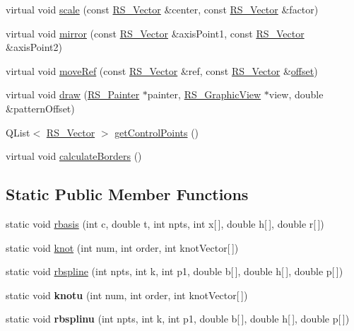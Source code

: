 \begin{DoxyCompactItemize}
\item 
virtual void \hyperlink{classRS__Spline_a0bcd286aa6e083eceba53390a56a9c6b}{scale} (const \hyperlink{classRS__Vector}{R\-S\-\_\-\-Vector} \&center, const \hyperlink{classRS__Vector}{R\-S\-\_\-\-Vector} \&factor)
\item 
virtual void \hyperlink{classRS__Spline_a21454167f4010bc0d2436aa8d8379313}{mirror} (const \hyperlink{classRS__Vector}{R\-S\-\_\-\-Vector} \&axis\-Point1, const \hyperlink{classRS__Vector}{R\-S\-\_\-\-Vector} \&axis\-Point2)
\item 
virtual void \hyperlink{classRS__Spline_ae57cfa1b12e958a176950db6931daee5}{move\-Ref} (const \hyperlink{classRS__Vector}{R\-S\-\_\-\-Vector} \&ref, const \hyperlink{classRS__Vector}{R\-S\-\_\-\-Vector} \&\hyperlink{classRS__Entity_aa296d21b9aac99161d386ce2f60f0fea}{offset})
\item 
virtual void \hyperlink{classRS__Spline_afe87f24a39ca03e2aaba0647846abf0c}{draw} (\hyperlink{classRS__Painter}{R\-S\-\_\-\-Painter} $\ast$painter, \hyperlink{classRS__GraphicView}{R\-S\-\_\-\-Graphic\-View} $\ast$view, double \&pattern\-Offset)
\item 
Q\-List$<$ \hyperlink{classRS__Vector}{R\-S\-\_\-\-Vector} $>$ \hyperlink{classRS__Spline_aef536f161e526820be8ba3bf5748a6d6}{get\-Control\-Points} ()
\item 
virtual void \hyperlink{classRS__Spline_a22585601e62ab8c0b90f945f90302f13}{calculate\-Borders} ()
\end{DoxyCompactItemize}
\subsection*{Static Public Member Functions}
\begin{DoxyCompactItemize}
\item 
static void \hyperlink{classRS__Spline_ac17c9d2c444e5c99bb2fe6886a3910d5}{rbasis} (int c, double t, int npts, int x\mbox{[}$\,$\mbox{]}, double h\mbox{[}$\,$\mbox{]}, double r\mbox{[}$\,$\mbox{]})
\item 
static void \hyperlink{classRS__Spline_ace7bae5dd82deb0a69582af5d8b1b0c7}{knot} (int num, int order, int knot\-Vector\mbox{[}$\,$\mbox{]})
\item 
static void \hyperlink{classRS__Spline_a5816a62154815628f3b928118ed9d855}{rbspline} (int npts, int k, int p1, double b\mbox{[}$\,$\mbox{]}, double h\mbox{[}$\,$\mbox{]}, double p\mbox{[}$\,$\mbox{]})
\item 
\hypertarget{classRS__Spline_a5f24d65e642b34f54e04ffb53bb14b25}{static void {\bfseries knotu} (int num, int order, int knot\-Vector\mbox{[}$\,$\mbox{]})}\label{classRS__Spline_a5f24d65e642b34f54e04ffb53bb14b25}

\item 
\hypertarget{classRS__Spline_adf510f9d002ef522378686f75965803e}{static void {\bfseries rbsplinu} (int npts, int k, int p1, double b\mbox{[}$\,$\mbox{]}, double h\mbox{[}$\,$\mbox{]}, double p\mbox{[}$\,$\mbox{]})}\label{classRS__Spline_adf510f9d002ef522378686f75965803e}

\end{DoxyCompactItemize}
